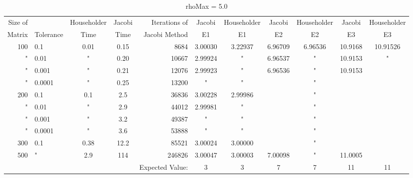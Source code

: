 \documentclass[twocolumn, groupedaddress]{revtex4-1}
\begin{document}
	
	\begin{table}[t]
		\centering
		\begin{tabular}{ r | l || c | c | r | c | c | c | c | c | c }
			Size of &           & Householder & Jacobi & Iterations of & Jacobi  & Householder &  Jacobi & Householder & Jacobi & Householder \\
			Matrix  & Tolerance &    Time     &  Time  & Jacobi Method &   E1    &      E1     &    E2   &      E2     &   E3   &      E3     \\
			\hline
			100     & 0.1       &    0.01     &   0.15 &      8684     & 3.00030 &   3.22937   & 6.96709 & 6.96536 & 10.9168 & 10.91526 \\
			"       & 0.01      &     "       &   0.20 &     10667     & 2.99924 &      "      & 6.96537 &    "    & 10.9153 & "\\
			"       & 0.001     &     "       &   0.21 &     12076     & 2.99923 &      "      & 6.96536 &    "    & 10.9153 &\\
			"       & 0.0001    &     "       &   0.25 &     13200     &    "    &      "      &         &    "    &         & \\
			200     & 0.1       &    0.1      &   2.5  &     36836     & 3.00228 &   2.99986   &         &    "    &         & \\
			"       & 0.01      &     "       &   2.9  &     44012     & 2.99981 &      "      &         &    "    &         & \\
			"       & 0.001     &     "       &   3.2  &     49387     &    "    &      "      &         &    "    &         & \\
			"       & 0.0001    &     "       &   3.6  &     53888     &    "    &      "      &         &    "    &         & \\
			300     & 0.1       &    0.38     &  12.2  &     85521     & 3.00024 &   3.00000   &         &    "    &         & \\
			500     &  "        &    2.9      &   114  &    246826     & 3.00047 &   3.00003   & 7.00098 &    "    & 11.0005 & \\
			\hline
			 & & & & Expected Value: & 3 & 3 & 7 & 7 & 11 & 11
			
		\end{tabular}
		\caption{rhoMax = 5.0 \label{table:relults}}
	\end{table}
	
\end{document}
